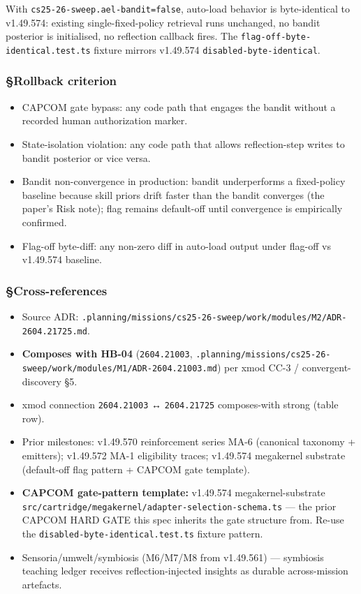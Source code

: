 \documentclass[11pt,letterpaper]{article}
\newcommand{\arxivid}[1]{\texttt{\textcolor{accent}{#1}}}
\providecommand{\tightlist}{\setlength{\itemsep}{0pt}\setlength{\parskip}{0pt}}
\begin{document}
With \texttt{cs25-26-sweep.ael-bandit=false}, auto-load behavior is
byte-identical to v1.49.574: existing single-fixed-policy retrieval runs
unchanged, no bandit posterior is initialised, no reflection callback
fires. The \texttt{flag-off-byte-identical.test.ts} fixture mirrors
v1.49.574 \texttt{disabled-byte-identical}.

\subsubsection{§Rollback criterion}

\begin{itemize}
\tightlist
\item
  CAPCOM gate bypass: any code path that engages the bandit without a
  recorded human authorization marker.
\item
  State-isolation violation: any code path that allows reflection-step
  writes to bandit posterior or vice versa.
\item
  Bandit non-convergence in production: bandit underperforms a
  fixed-policy baseline because skill priors drift faster than the
  bandit converges (the paper's Risk note); flag remains default-off
  until convergence is empirically confirmed.
\item
  Flag-off byte-diff: any non-zero diff in auto-load output under
  flag-off vs v1.49.574 baseline.
\end{itemize}

\subsubsection{§Cross-references}

\begin{itemize}
\tightlist
\item
  Source ADR:
  \texttt{.planning/missions/cs25-26-sweep/work/modules/M2/ADR-\arxivid{2604.21725}.md}.
\item
  \textbf{Composes with HB-04} (\arxivid{2604.21003},
  \texttt{.planning/missions/cs25-26-sweep/work/modules/M1/ADR-\arxivid{2604.21003}.md})
  per xmod CC-3 / convergent-discovery §5.
\item
  xmod connection \arxivid{2604.21003} ↔ \arxivid{2604.21725}
  composes-with strong (table row).
\item
  Prior milestones: v1.49.570 reinforcement series MA-6 (canonical
  taxonomy + emitters); v1.49.572 MA-1 eligibility traces; v1.49.574
  megakernel substrate (default-off flag pattern + CAPCOM gate
  template).
\item
  \textbf{CAPCOM gate-pattern template:} v1.49.574 megakernel-substrate
  \texttt{src/cartridge/megakernel/adapter-selection-schema.ts} --- the
  prior CAPCOM HARD GATE this spec inherits the gate structure from.
  Re-use the \texttt{disabled-byte-identical.test.ts} fixture pattern.
\item
  Sensoria/umwelt/symbiosis (M6/M7/M8 from v1.49.561) --- symbiosis
  teaching ledger receives reflection-injected insights as durable
  across-mission artefacts.
\end{itemize}
\end{document}

